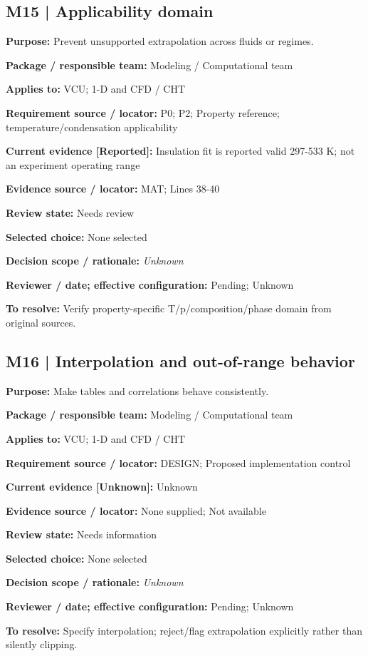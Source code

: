 \documentclass[11pt]{article}
\begin{document}
\begin{minipage}{\textwidth}\small\setlength{\parskip}{2pt}
\subsection*{M15 | Applicability domain}
\textbf{Purpose:} Prevent unsupported extrapolation across fluids or regimes.\par
\textbf{Package / responsible team:} Modeling / Computational team\par
\textbf{Applies to:} VCU; 1-D and CFD / CHT\par
\textbf{Requirement source / locator:} P0; P2; Property reference; temperature/condensation applicability\par
\textbf{Current evidence [Reported]:} Insulation fit is reported valid 297-533 K; not an experiment operating range\par
\textbf{Evidence source / locator:} MAT; Lines 38-40\par
\textbf{Review state:} Needs review\par
\textbf{Selected choice:} None selected\par
\textbf{Decision scope / rationale:} \textit{Unknown}\par
\textbf{Reviewer / date; effective configuration:} Pending; Unknown\par
\textbf{To resolve:} Verify property-specific T/p/composition/phase domain from original sources.\par
\end{minipage}\par\vspace{5pt}
\begin{minipage}{\textwidth}\small\setlength{\parskip}{2pt}
\subsection*{M16 | Interpolation and out-of-range behavior}
\textbf{Purpose:} Make tables and correlations behave consistently.\par
\textbf{Package / responsible team:} Modeling / Computational team\par
\textbf{Applies to:} VCU; 1-D and CFD / CHT\par
\textbf{Requirement source / locator:} DESIGN; Proposed implementation control\par
\textbf{Current evidence [Unknown]:} Unknown\par
\textbf{Evidence source / locator:} None supplied; Not available\par
\textbf{Review state:} Needs information\par
\textbf{Selected choice:} None selected\par
\textbf{Decision scope / rationale:} \textit{Unknown}\par
\textbf{Reviewer / date; effective configuration:} Pending; Unknown\par
\textbf{To resolve:} Specify interpolation; reject/flag extrapolation explicitly rather than silently clipping.\par
\end{minipage}\par\vspace{5pt}
\end{document}
